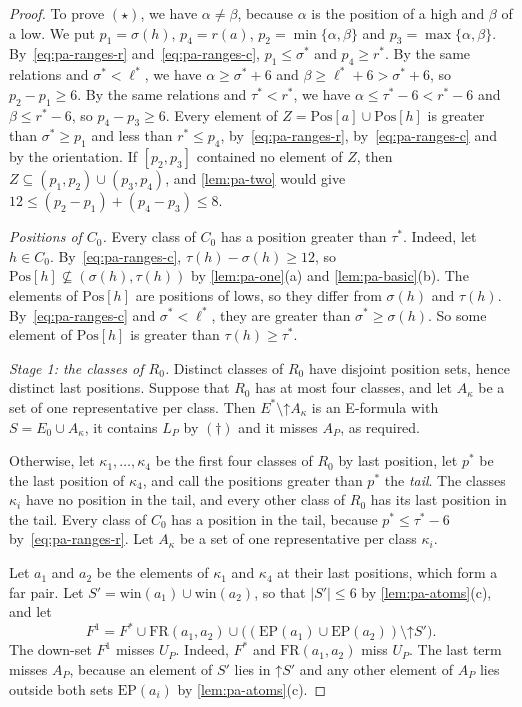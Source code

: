\documentclass[pdflatex,sn-mathphys-num]{sn-jnl}%
\theoremstyle{thmstyleone}%
\theoremstyle{thmstyletwo}%
\theoremstyle{thmstylethree}%
\newcommand{\upp}{\mathord{\uparrow}}%
\newcommand{\Pos}{\mathrm{Pos}}%
\newcommand{\win}{\mathrm{win}}%
\newcommand{\FR}{\mathrm{FR}}%
\newcommand{\EP}{\mathrm{EP}}%
\begin{document}
\begin{proof}
To prove $(\star)$, we have $\alpha \neq \beta$, because $\alpha$ is the position of a high and $\beta$ of a low.
We put $p_1 = \sigma(h)$, $p_4 = r(a)$, $p_2 = \min\{\alpha, \beta\}$ and $p_3 = \max\{\alpha, \beta\}$.
By~\eqref{eq:pa-ranges-r} and~\eqref{eq:pa-ranges-c}, $p_1 \leq \sigma^*$ and $p_4 \geq r^*$.
By the same relations and $\sigma^* < \ell^*$, we have $\alpha \geq \sigma^* + 6$ and $\beta \geq \ell^* + 6 > \sigma^* + 6$, so $p_2 - p_1 \geq 6$.
By the same relations and $\tau^* < r^*$, we have $\alpha \leq \tau^* - 6 < r^* - 6$ and $\beta \leq r^* - 6$, so $p_4 - p_3 \geq 6$.
Every element of $Z = \Pos[a] \cup \Pos[h]$ is greater than $\sigma^* \geq p_1$ and less than $r^* \leq p_4$, by~\eqref{eq:pa-ranges-r}, by~\eqref{eq:pa-ranges-c} and by the orientation.
If $[p_2, p_3]$ contained no element of $Z$, then $Z \subseteq (p_1, p_2) \cup (p_3, p_4)$, and \cref{lem:pa-two} would give $12 \leq (p_2 - p_1) + (p_4 - p_3) \leq 8$.

\emph{Positions of $C_0$.}
Every class of $C_0$ has a position greater than $\tau^*$.
Indeed, let $h \in C_0$.
By~\eqref{eq:pa-ranges-c}, $\tau(h) - \sigma(h) \geq 12$, so $\Pos[h] \not\subseteq (\sigma(h), \tau(h))$ by \cref{lem:pa-one}(a) and \cref{lem:pa-basic}(b).
The elements of $\Pos[h]$ are positions of lows, so they differ from $\sigma(h)$ and $\tau(h)$.
By~\eqref{eq:pa-ranges-c} and $\sigma^* < \ell^*$, they are greater than $\sigma^* \geq \sigma(h)$.
So some element of $\Pos[h]$ is greater than $\tau(h) \geq \tau^*$.

\emph{Stage 1: the classes of $R_0$.}
Distinct classes of $R_0$ have disjoint position sets, hence distinct last positions.
Suppose that $R_0$ has at most four classes, and let $A_\kappa$ be a set of one representative per class.
Then $E^* \setminus \upp A_\kappa$ is an E-formula with $S = E_0 \cup A_\kappa$, it contains $L_P$ by $(\dagger)$ and it misses $A_P$, as required.

Otherwise, let $\kappa_1, \dots, \kappa_4$ be the first four classes of $R_0$ by last position, let $p^*$ be the last position of $\kappa_4$, and call the positions greater than $p^*$ the \emph{tail}.
The classes $\kappa_i$ have no position in the tail, and every other class of $R_0$ has its last position in the tail.
Every class of $C_0$ has a position in the tail, because $p^* \leq \tau^* - 6$ by~\eqref{eq:pa-ranges-r}.
Let $A_\kappa$ be a set of one representative per class $\kappa_i$.

Let $a_1$ and $a_2$ be the elements of $\kappa_1$ and $\kappa_4$ at their last positions, which form a far pair.
Let $S' = \win(a_1) \cup \win(a_2)$, so that $|S'| \leq 6$ by \cref{lem:pa-atoms}(c), and let
\[
F^1 = F^* \cup \FR(a_1, a_2) \cup \bigl((\EP(a_1) \cup \EP(a_2)) \setminus \upp S'\bigr).
\]
The down-set $F^1$ misses $U_P$.
Indeed, $F^*$ and $\FR(a_1, a_2)$ miss $U_P$.
The last term misses $A_P$, because an element of $S'$ lies in $\upp S'$ and any other element of $A_P$ lies outside both sets $\EP(a_i)$ by \cref{lem:pa-atoms}(c).


\end{proof}
\end{document}
